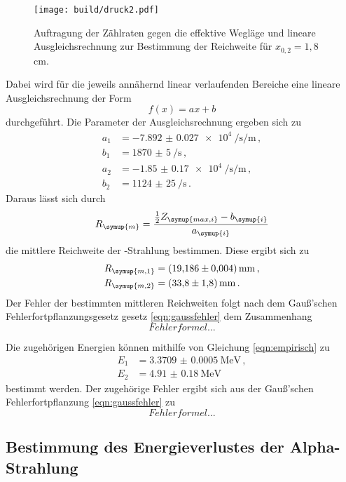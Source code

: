 \begin{figure}[H]
  \centering
  \texttt{[image: build/druck2.pdf]}
  \caption{Auftragung der Zählraten gegen die effektive Wegläge und lineare Ausgleichsrechnung
  zur Bestimmung der Reichweite für $x_{0,2}=1{,}8\,$cm.}
  \label{fig:druck2}
\end{figure}

Dabei wird für die jeweils annähernd linear verlaufenden Bereiche eine lineare Ausgleichsrechnung
der Form
\begin{equation}
  f(x)=ax+b
\end{equation}
durchgeführt. Die Parameter der Ausgleichsrechnung ergeben sich zu
\begin{align*}
  a_1 &= \SI{-7.892(0027)e4}{\per\second\per\meter}\,, \\
  b_1 &= \SI{1870(5)}{\per\second}\,,  \\
  a_2 &= \SI{-1.85(017)e4}{\per\second\per\meter} \,,  \\
  b_2 &= \SI{1124(25)}{\per\second} \,.
\end{align*}
Daraus lässt sich durch
\begin{equation}
  R_{\symup{m}}=\frac{\frac{1}{2}Z_{\symup{max,i}}-b_{\symup{i}}}{a_{\symup{i}}}
\end{equation}
die mittlere Reichweite der \alpha-Strahlung bestimmen. Diese ergibt sich zu
\begin{align*}
  R_{\symup{m,1}}&=\SI{19.186(0004)}{\milli\meter} \,, \\
  R_{\symup{m,2}}&=\SI{33.8(18)}{\milli\meter} \,.
\end{align*}
Der Fehler der bestimmten mittleren Reichweiten folgt nach dem Gauß'schen Fehlerfortpflanzungsgesetz
gesetz \eqref{eqn:gaussfehler} dem Zusammenhang
\begin{equation}
  Fehlerformel...
\end{equation}

Die zugehörigen Energien können mithilfe von Gleichung \eqref{eqn:empirisch} zu
\begin{align*}
  E_1&=\SI{3.3709(00005)}{\MeV} \,,\\
  E_2&=\SI{4.91(018)}{\MeV}
\end{align*}
bestimmt werden. Der zugehörige Fehler ergibt sich aus der Gauß'schen Fehlerfortpflanzung
\eqref{eqn:gaussfehler} zu
\begin{equation}
  Fehlerformel...
\end{equation}

\subsection{Bestimmung des Energieverlustes der Alpha-Strahlung}
\label{subsec:energie}


